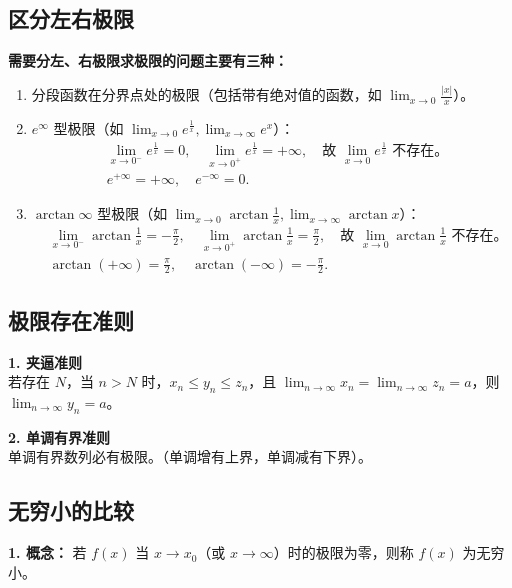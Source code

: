 \documentclass[a4paper,12pt]{ctexart} %
\newenvironment{purplebox}
  {\begin{tcolorbox}[colback=white, colframe=boxpurple, boxrule=1pt, sharp corners, title=\textbf{定义/定理}]}
  {\end{tcolorbox}}
\newcommand{\zh}[1]{\par\smallskip\noindent\textbf{#1}\par\smallskip}
\begin{document}
\subsection{区分左右极限}
\zh{需要分左、右极限求极限的问题主要有三种：}
\begin{enumerate}
    \item 分段函数在分界点处的极限（包括带有绝对值的函数，如 $\lim_{x \to 0} \frac{|x|}{x}$）。
    \item $e^\infty$ 型极限（如 $\lim_{x \to 0} e^{\frac{1}{x}}, \lim_{x \to \infty} e^x$）：
    \begin{align*}
        &\lim_{x \to 0^-} e^{\frac{1}{x}} = 0, \quad \lim_{x \to 0^+} e^{\frac{1}{x}} = +\infty, \quad \text{故 } \lim_{x \to 0} e^{\frac{1}{x}} \text{ 不存在。} \\
        &e^{+\infty} = +\infty, \quad e^{-\infty} = 0.
    \end{align*}
    \item $\arctan \infty$ 型极限（如 $\lim_{x \to 0} \arctan \frac{1}{x}, \lim_{x \to \infty} \arctan x$）：
    \begin{align*}
        &\lim_{x \to 0^-} \arctan \frac{1}{x} = -\frac{\pi}{2}, \quad \lim_{x \to 0^+} \arctan \frac{1}{x} = \frac{\pi}{2}, \quad \text{故 } \lim_{x \to 0} \arctan \frac{1}{x} \text{ 不存在。} \\
        &\arctan(+\infty) = \frac{\pi}{2}, \quad \arctan(-\infty) = -\frac{\pi}{2}.
    \end{align*}
\end{enumerate}

\subsection{极限存在准则}
\begin{purplebox}
    \textbf{1. 夹逼准则} \\
    若存在 $N$，当 $n > N$ 时，$x_n \leqslant y_n \leqslant z_n$，且 $\lim_{n \to \infty} x_n = \lim_{n \to \infty} z_n = a$，则 $\lim_{n \to \infty} y_n = a$。

    \textbf{2. 单调有界准则} \\
    单调有界数列必有极限。（单调增有上界，单调减有下界）。
\end{purplebox}

\subsection{无穷小的比较}
\textbf{1. 概念：} 若 $f(x)$ 当 $x \to x_0$（或 $x \to \infty$）时的极限为零，则称 $f(x)$ 为无穷小。
\end{document}
